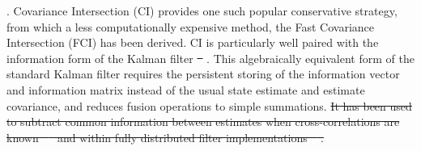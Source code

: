 \documentclass[letterpaper, 10 pt, conference]{ieeeconf}  %
\providecommand{\DIFadd}[1]{{\protect\color{blue}\uwave{#1}}} %
\providecommand{\DIFdel}[1]{{\protect\color{red}\sout{#1}}}                      %
\providecommand{\DIFaddbegin}{} %
\providecommand{\DIFaddend}{} %
\providecommand{\DIFdelbegin}{} %
\providecommand{\DIFdelend}{} %
\begin{document}
{{\cite{carlsonFederatedFilterFaulttolerant1988,julierNondivergentEstimationAlgorithm1997,sijsStateFusionUnknown2012,noackDecentralizedDataFusion2017,niehsenInformationFusionBased2002,frankenImprovedFastCovariance2005}}\hspace{0pt}%
}\DIFdelend \DIFaddbegin \DIFadd{\mbox{%
\cite{julierNondivergentEstimationAlgorithm1997,noackDecentralizedDataFusion2017,niehsenInformationFusionBased2002}}\hspace{0pt}%
}\DIFaddend . Covariance Intersection (CI) \cite{julierNondivergentEstimationAlgorithm1997} provides one such popular conservative strategy, from which a less computationally expensive method, the Fast Covariance Intersection (FCI) \cite{niehsenInformationFusionBased2002} has been derived. CI is particularly well paired with the information form of the Kalman filter \DIFdelbegin \DIFdel{\mbox{%
\cite{mutambaraDecentralizedEstimationControl1998}}\hspace{0pt}%
}\DIFdelend \DIFaddbegin \DIFadd{\mbox{%
\cite{mutambaraDecentralizedEstimationControl1998,pfaffInformationFormDistributed2017}}\hspace{0pt}%
}\DIFaddend . This algebraically equivalent form of the standard Kalman filter requires the persistent storing of the information vector and information matrix instead of the usual state estimate and estimate covariance, and reduces fusion operations to simple summations. 
\DIFdelbegin \DIFdel{It has been used to subtract common information between estimates when cross-correlations are known \mbox{%
\cite{grimeDataFusionDecentralized1994} }\hspace{0pt}%
and within fully distributed filter implementations \mbox{%
\cite{pfaffInformationFormDistributed2017}}\hspace{0pt}%
.
}\DIFdelend 
\end{document}

